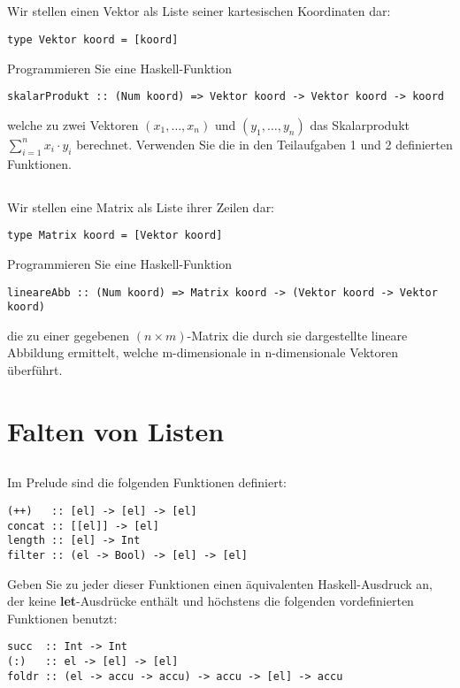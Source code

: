 \documentclass{article}
\begin{document}
\subsection{}
Wir stellen einen Vektor als Liste seiner kartesischen Koordinaten dar:
\begin{lstlisting}
type Vektor koord = [koord]
\end{lstlisting}
Programmieren Sie eine Haskell-Funktion
\begin{lstlisting}
skalarProdukt :: (Num koord) => Vektor koord -> Vektor koord -> koord
\end{lstlisting}
welche zu zwei Vektoren $(x_1, \ldots , x_n)$ und $(y_1, \ldots ,y_n)$ das Skalarprodukt
$\sum^n_{i=1}{x_i \cdot y_i}$ berechnet. Verwenden Sie die in den Teilaufgaben 1 und 2 definierten Funktionen.
\subsection{}
Wir stellen eine Matrix als Liste ihrer Zeilen dar:
\begin{lstlisting}
type Matrix koord = [Vektor koord]
\end{lstlisting}
Programmieren Sie eine Haskell-Funktion
\begin{lstlisting}
lineareAbb :: (Num koord) => Matrix koord -> (Vektor koord -> Vektor koord)
\end{lstlisting}
die zu einer gegebenen $(n \times m)$-Matrix die durch sie dargestellte lineare Abbildung
ermittelt, welche m-dimensionale in n-dimensionale Vektoren überführt.

\section{Falten von Listen}
\subsection{}
Im Prelude sind die folgenden Funktionen definiert:
\begin{lstlisting}
(++)   :: [el] -> [el] -> [el]
concat :: [[el]] -> [el]
length :: [el] -> Int
filter :: (el -> Bool) -> [el] -> [el]
\end{lstlisting}
Geben Sie zu jeder dieser Funktionen einen äquivalenten Haskell-Ausdruck an,
der keine \textbf{let}-Ausdrücke enthält und höchstens die folgenden vordefinierten
Funktionen benutzt:
\begin{lstlisting}
succ  :: Int -> Int
(:)   :: el -> [el] -> [el]
foldr :: (el -> accu -> accu) -> accu -> [el] -> accu
\end{lstlisting}
\end{document}
